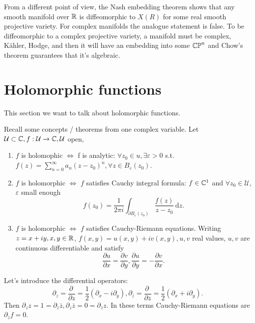 From a different point of view, the Nash embedding theorem shows that any smooth manifold over $\mathbb{R}$ is diffeomorphic to $X(R)$ for some real smooth projective variety.
For complex manifolds the analogue statement is false. To be diffeomorphic to a complex projective variety, a manifold must be complex, K\"{a}hler, Hodge, and then it will have an embedding into some $\mathbb{CP}^{n}$ and Chow's theorem guarantees that it's algebraic.

\section{Holomorphic functions}
This section we want to talk about holomorphic functions.

Recall some concepts / theorems from one complex variable. Let   $\mathcal{U}\subset \mathbb{C}, f:\mathcal{U}\to \mathbb{C}, \mathcal{U}$ open,
\begin{enumerate}
  \item $f$ is holomophic $\Leftrightarrow$ f is analytic: $\forall  z_0 \in  u, \exists \varepsilon >0$ s.t. $f(z)=\sum_{n=0}^{\infty} a_n (z-z_0)^n,\forall z\in B_{\varepsilon }(z_0)$.
  \item  $f$ is holomorphic $\Leftrightarrow$ $f$ satisfies Cauchy integral formula: $f\in \mathbb{C}^{1}$ and $\forall z_0 \in  \mathcal{U}$, $\varepsilon $ small enough 
    \[
      f(z_0)=\frac{1}{2\pi i}\int_{\partial B_\varepsilon (z_0)}\frac{ f(z)}{z-z_0}\,\mathrm{d}z.
    \] 
  \item $f$ is holomorphic $\Leftrightarrow$ $f$ satisfies Cauchy-Riemann equations. Writing $z=x+iy,x,y\in \mathbb{R}$, $f(x,y)=u(x,y)+iv(x,y), u,v$ real values, $u,v$ are continuous differentiable and satisfy
    \[
    \frac{\partial u}{\partial x} =\frac{\partial v}{\partial y},  \frac{\partial u}{\partial y} =-\frac{\partial v}{\partial x} . 
    \] 
\end{enumerate}

Let's introduce the differential operators:
\[
  \partial_z=\frac{\partial ~}{\partial z} =\frac{1}{2}\left( \partial_x-i\partial_y \right) ,\partial_{\overline{z}}=\frac{\partial ~}{\partial \overline{z}} =\frac{1}{2}\left( \partial_x+i\partial_y \right) .
\] 	
Then $\partial_z z=1=\partial_{\overline{z}}\overline{z},\partial_z\overline{z}=0=\partial_{\overline{z}}z$. In these terms Cauchy-Riemann equations are $\partial_{\overline{z}}f=0$.

